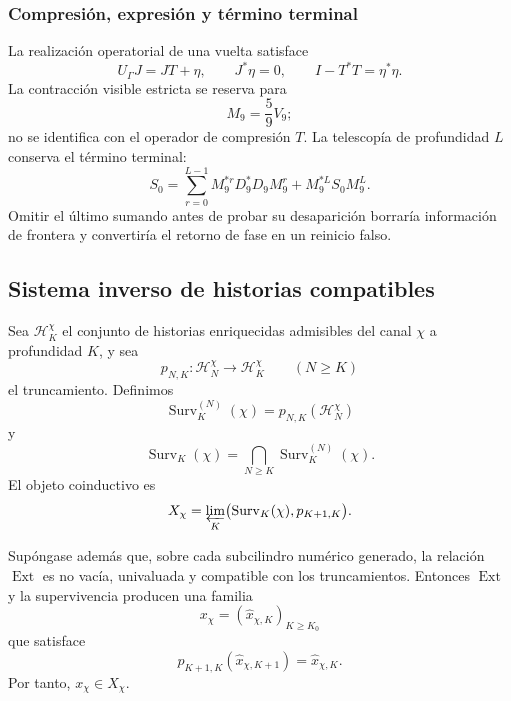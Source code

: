 \subsubsection{Compresión, expresión y término terminal}

La realización operatorial de una vuelta satisface
\begin{equation}
 U_\Gamma J=JT+\eta,
 \qquad
 J^*\eta=0,
 \qquad
 I-T^*T=\eta^*\eta.
 \label{p12-83-c9-s4:eq:compresion-expresion-precision}
\end{equation}
La contracción visible estricta se reserva para
\[
 M_9=\frac59V_9;
\]
no se identifica con el operador de compresión \(T\). La telescopía de
profundidad \(L\) conserva el término terminal:
\begin{equation}
 S_0=
 \sum_{r=0}^{L-1}M_9^{*r}D_9^*D_9M_9^r
 +M_9^{*L}S_0M_9^L.
 \label{p12-83-c9-s4:eq:telescopia-terminal-precision}
\end{equation}
Omitir el último sumando antes de probar su desaparición borraría
información de frontera y convertiría el retorno de fase en un reinicio
falso.

\subsection{Sistema inverso de historias compatibles}

Sea \(\mathcal H_K^\chi\) el conjunto de historias enriquecidas admisibles
del canal \(\chi\) a profundidad \(K\), y sea
\[
 p_{N,K}:\mathcal H_N^\chi\longrightarrow\mathcal H_K^\chi
 \qquad(N\geq K)
\]
el truncamiento. Definimos
\[
 \operatorname{Surv}_K^{(N)}(\chi)
 =p_{N,K}(\mathcal H_N^\chi)
\]
y
\begin{equation}
 \operatorname{Surv}_K(\chi)
 =\bigcap_{N\geq K}\operatorname{Surv}_K^{(N)}(\chi).
 \label{p12-83-c9-s4:eq:supervivencia-todas-profundidades}
\end{equation}
El objeto coinductivo es
\begin{equation}
 X_\chi=
 \varprojlim_K
 \bigl(\operatorname{Surv}_K(\chi),p_{K+1,K}\bigr).
 \label{p12-83-c9-s4:eq:limite-inverso-caracteres}
\end{equation}

\begin{theorem}
\label{p12-83-c9-s4:thm:seccion-compatible-caracteres}
Supóngase además que, sobre cada subcilindro numérico generado, la
relación \(\operatorname{Ext}\) es no vacía, univaluada y compatible con los
truncamientos. Entonces \(\operatorname{Ext}\) y la supervivencia producen una familia
\[
 x_\chi=(\widehat x_{\chi,K})_{K\geq K_0}
\]
que satisface
\[
 p_{K+1,K}(\widehat x_{\chi,K+1})
 =\widehat x_{\chi,K}.
\]
Por tanto, \(x_\chi\in X_\chi\).
\end{theorem}

